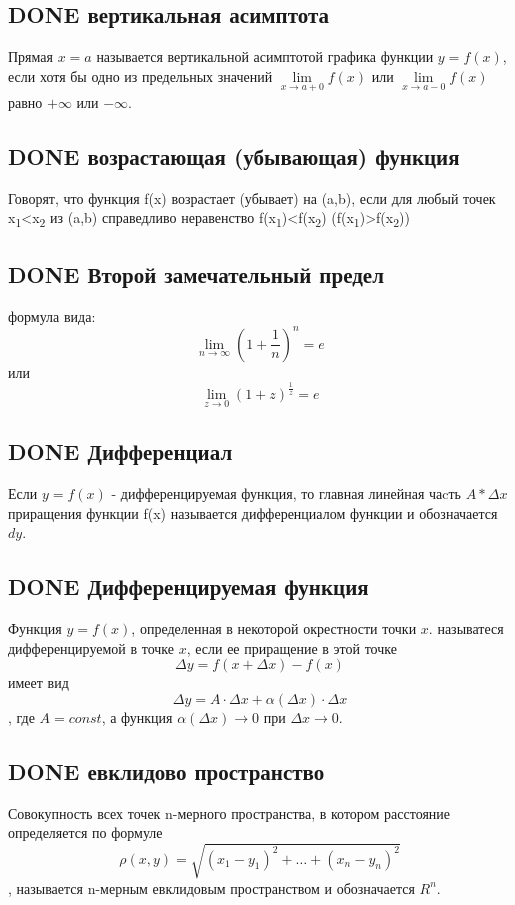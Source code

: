 \documentclass[11pt]{article}
\begin{document}
\subsection{{\bfseries\sffamily DONE} вертикальная асимптота}
\label{sec:org2d7ac0c}
Прямая \(x=a\) называется вертикальной асимптотой графика функции \(y=f(x)\), если хотя бы одно из предельных значений \(\lim\limits_{x\to a+0}f(x)\) или \(\lim\limits_{x\to a−0}f(x)\) равно \(+\infty\) или \(−\infty\).
\subsection{{\bfseries\sffamily DONE} возрастающая (убывающая) функция}
\label{sec:org99bdabf}
Говорят, что функция f(x) возрастает (убывает) на (a,b), если для любый точек x\textsubscript{1}<x\textsubscript{2} из (a,b) справедливо неравенство f(x\textsubscript{1})<f(x\textsubscript{2}) (f(x\textsubscript{1})>f(x\textsubscript{2}))
\subsection{{\bfseries\sffamily DONE} Второй замечательный предел}
\label{sec:org6e6ed07}
 формула вида:
$$\lim\limits_{n\to \infty}(1+\frac{1}{n})^n=e$$
или
$$\lim\limits_{z\to 0}(1+z)^{\frac{1}{z}}=e$$

\subsection{{\bfseries\sffamily DONE} Дифференциал}
\label{sec:org8e4e4d2}
Если \(y=f(x)\) - дифференцируемая функция, то главная линейная чаcть \(A*\Delta x\) приращения функции f(x) называется дифференциалом функции и обозначается \(dy\).
\subsection{{\bfseries\sffamily DONE} Дифференцируемая функция}
\label{sec:org5cfa376}
Функция \(y=f(x)\), определенная в некоторой окрестности точки \(x\). называтеся дифференцируемой в точке \(x\), если ее приращение в этой точке
$$\Delta y=f(x+\Delta x)−f(x)$$
имеет вид
$$\Delta y=A⋅\Delta x+\alpha(\Delta x)⋅\Delta x$$,
где \(A=const\), а функция \(\alpha(\Delta x)\to 0\) при \(\Delta x\to 0\).
\subsection{{\bfseries\sffamily DONE} евклидово пространство}
\label{sec:orgf121396}
Совокупность всех точек n-мерного пространства, в котором расстояние определяется по формуле
$$\rho(x,y)=\sqrt{(x_1−y_1)^2+…+(x_n−y_n)^2}$$,
называется n-мерным евклидовым пространством и обозначается \(R^n\).
\end{document}
